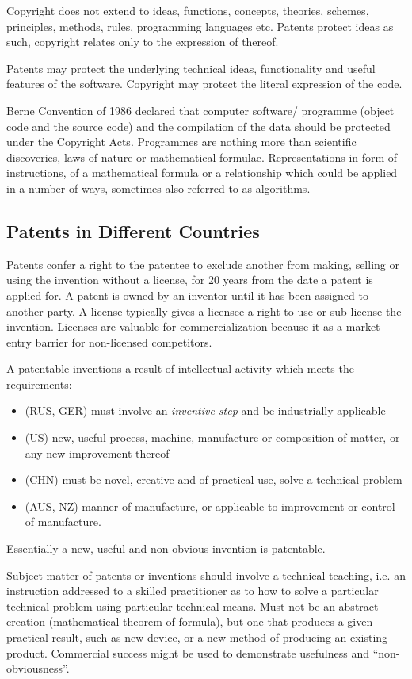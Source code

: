 \documentclass[10pt,a4paper,twocolumn]{article}
\begin{document}
Copyright does not extend to ideas, functions, concepts, theories, schemes, principles,
methods, rules, programming languages etc. Patents protect ideas as such, copyright
relates only to the expression of thereof.

Patents may protect the underlying technical ideas, functionality and useful features of
the software. Copyright may protect the literal expression of the code.

Berne Convention of 1986 declared that computer software/ programme (object code and
the source code) and the compilation of the data should be protected under the Copyright
Acts. Programmes are nothing more than scientific discoveries, laws of nature or mathematical
formulae. Representations in form of instructions, of a mathematical formula or a
relationship which could be applied in a number of ways, sometimes also referred to as
algorithms.

\subsection{Patents in Different Countries} %
\label{sub:patents_in_different_countries}

Patents confer a right to the patentee to exclude another from making, selling or using
the invention without a license, for 20 years from the date a patent is applied for. A
patent is owned by an inventor until it has been assigned to another party. A license
typically gives a licensee a right to use or sub-license the invention. Licenses are
valuable for commercialization because it as a market entry barrier for non-licensed
competitors.

A patentable inventions a result of intellectual activity which meets the requirements:
\begin{itemize}
  \item (RUS, GER) must involve an \textit{inventive step} and be industrially applicable
  \item (US) new, useful process, machine, manufacture or composition of matter, or any
  new improvement thereof
  \item (CHN) must be novel, creative and of practical use, solve a technical problem
  \item (AUS, NZ) manner of manufacture, or applicable to improvement or control of
  manufacture.
\end{itemize}
Essentially a new, useful and non-obvious invention is patentable.


Subject matter of patents or inventions should involve a technical teaching, i.e. an
instruction addressed to a skilled practitioner as to how to solve a particular technical
problem using particular technical means. Must not be an abstract creation (mathematical
theorem of formula), but one that produces a given practical result, such as new device,
or a new method of producing an existing product. Commercial success might be used to
demonstrate usefulness and ``non-obviousness''.
\end{document}
